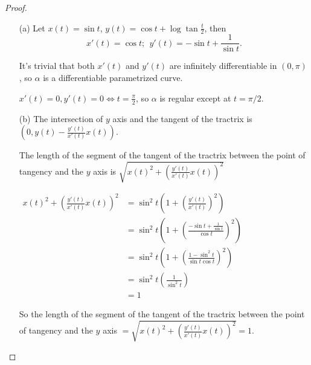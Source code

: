 \documentclass[12pt,a4paper]{article}
\begin{document}
\begin{proof} %

\begin{enumerate}
\item[]
\item[(a)] Let $x(t)=\sin t$, $y(t)=\cos t+\log\tan\frac{t}{2}$, then \[x'(t)=\cos t; \ \  y'(t)=-\sin t+\frac{1}{\sin t}.\]

It's trivial that both $x'(t)$ and $y'(t)$ are infinitely differentiable in $(0,\pi)$, so $\alpha$ is a differentiable parametrized curve.

$x'(t)=0, y'(t)=0 \Longleftrightarrow t=\frac{\pi}{2}$, so $\alpha$ is regular except at $t=\pi/2$.
\item[(b)] The intersection of $y$ axis and the tangent of the tractrix is $\left(0,y(t)-\frac{y'(t)}{x'(t)}x(t)\right)$.

The length of the segment of the tangent of the tractrix between the point of tangency and the $y$ axis is $\sqrt{x(t)^2+\left(\frac{y'(t)}{x'(t)}x(t)\right)^2}$

\begin{math}\begin{aligned}
x(t)^2+\left(\frac{y'(t)}{x'(t)}x(t)\right)^2 &= \sin^2{t}\left(1+\left(\frac{y'(t)}{x'(t)}\right)^2\right)\\
&= \sin^2{t}\left(1+\left(\frac{-\sin t+\frac{1}{\sin t}}{\cos t}\right)^2\right)\\
&= \sin^2{t}\left(1+\left(\frac{1-\sin^2 t}{\sin{t}\cos{t}}\right)^2\right)\\
&= \sin^2{t}\left(\frac{1}{\sin^2{t}}\right)\\
&= 1
\end{aligned}\end{math}

So the length of the segment of the tangent of the tractrix between the point of tangency and the $y$ axis $ = \sqrt{x(t)^2+\left(\frac{y'(t)}{x'(t)}x(t)\right)^2} = 1$.
\end{enumerate}
\end{proof}
\end{document}
